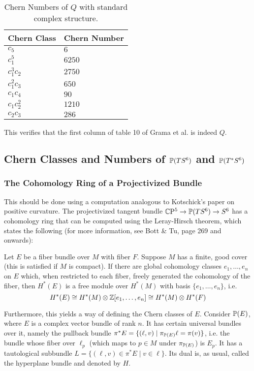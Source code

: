 \documentclass{scrartcl}
\begin{document}
\begin{table}[ht!]\centering
	\begin{tabular}{ll} \toprule
		Chern Class & Chern Number \\ \midrule
		$c_5$ 		& $6$ \\
		$c_1^5$ 	& $6250$\\
		$c_1^3c_2$	& $2750$ \\
		$c_1^2c_3$	& $650$ \\
		$c_1c_4$	& $90$ \\
		$c_1c_2^2$	& $1210$ \\
		$c_2c_3$	& $286$ \\ \bottomrule
	\end{tabular}
	\caption{Chern Numbers of $Q$ with standard complex structure.}
\end{table}

This verifies that the first column of table 10 of Grama et al. is indeed $Q$.

\subsection{Chern Classes and Numbers of $\P(TS^6)$ and $\P(T^*S^6)$}

\subsubsection{The Cohomology Ring of a Projectivized Bundle}

This should be done using a computation analogous to Kotschick's paper on positive curvature. The projectivized tangent bundle $\CP^5\to \P(TS^6)\to S^6$ has a cohomology ring that can be computed using the Leray-Hirsch theorem, which states the following (for more information, see Bott \& Tu, page 269 and onwards):

\begin{thm}
	Let $E$ be a fiber bundle over $M$ with fiber $F$. Suppose $M$ has a finite, good cover (this is satisfied if $M$ is compact). If there are global cohomology classes $e_1,\dots,e_n$ on $E$ which, when restricted to each fiber, freely generated the cohomology of the fiber, then $H^*(E)$ is a free module over $H^*(M)$ with basis $\{e_1,\dots,e_n\}$, i.e.
	\begin{equation*}
		H^*(E)\cong H^*(M)\otimes \Z[e_1,\dots,e_n]\cong H^*(M)\otimes H^*(F)
	\end{equation*}
\end{thm}

Furthermore, this yields a way of defining the Chern classes of $E$. Consider $\P(E)$, where $E$ is a complex vector bundle of rank $n$. It has certain universal bundles over it, namely the pullback bundle $\pi^*E=\{(\ell,v)\mid \pi_{\P(E)}\ell=\pi(v)\}$, i.e. the bundle whose fiber over $\ell_p$ (which maps to $p\in M$ under $\pi_{\P(E)}$) is $E_p$. It has a tautological subbundle $L=\{(\ell,v)\in \pi^*E\mid v\in \ell\}$. Its dual is, as usual, called the hyperplane bundle and denoted by $H$. 
\end{document}
